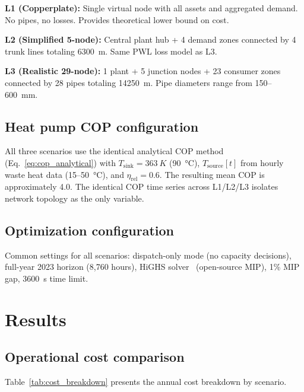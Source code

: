 \documentclass[a4paper,fleqn]{cas-dc}
\begin{document}
\textbf{L1 (Copperplate):} Single virtual node with all assets and aggregated demand. No pipes, no losses. Provides theoretical lower bound on cost.

\textbf{L2 (Simplified 5-node):} Central plant hub + 4 demand zones connected by 4 trunk lines totaling \SI{6300}{m}. Same PWL loss model as L3.

\textbf{L3 (Realistic 29-node):} 1 plant + 5 junction nodes + 23 consumer zones connected by 28 pipes totaling \SI{14250}{m}. Pipe diameters range from 150--\SI{600}{mm}.

\subsection{Heat pump COP configuration}

All three scenarios use the identical analytical COP method (Eq.~\ref{eq:cop_analytical}) with $T_\mathrm{sink} = \SI{363}{K}$ (\SI{90}{\degreeCelsius}), $T_\mathrm{source}[t]$ from hourly waste heat data (15--\SI{50}{\degreeCelsius}), and $\eta_\mathrm{rel} = 0.6$. The resulting mean COP is approximately 4.0. The identical COP time series across L1/L2/L3 isolates network topology as the only variable.

\subsection{Optimization configuration}

Common settings for all scenarios: dispatch-only mode (no capacity decisions), full-year 2023 horizon (8,760 hours), HiGHS solver~\citep{HiGHS2021} (open-source MIP), 1\% MIP gap, \SI{3600}{s} time limit.


\section{Results}\label{sec:results}

\subsection{Operational cost comparison}

Table~\ref{tab:cost_breakdown} presents the annual cost breakdown by scenario.
\end{document}
